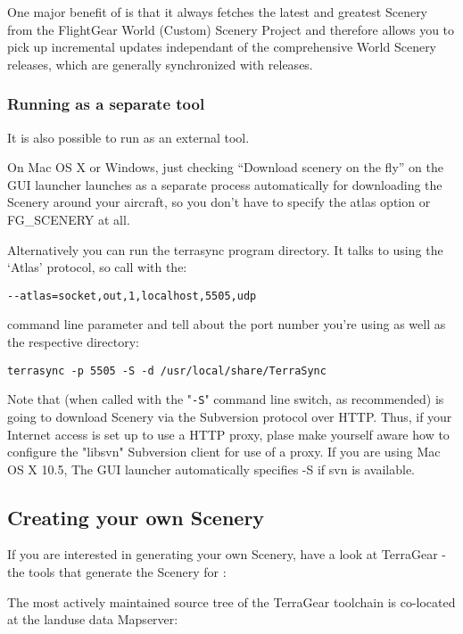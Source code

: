 One major benefit of \TerraSync{} is that it always fetches the latest and
greatest Scenery from the FlightGear World (Custom) Scenery Project and
therefore allows you to pick up incremental updates independant of the
comprehensive World Scenery releases, which are generally synchronized
with \FlightGear{} releases.

\subsubsection{Running \TerraSync{} as a separate tool}

It is also possible to run \TerraSync{} as an external tool. 

On Mac OS X or Windows, just checking ``Download scenery on the fly'' on
the GUI launcher launches \TerraSync{} as a separate process automatically 
for downloading the Scenery around your aircraft, so you don't have to 
specify the atlas option or FG\_SCENERY at all. 

Alternatively you can run the terrasync program directory. It talks to
\FlightGear{} using the `Atlas' protocol, so call \FlightGear{} with the:

\texttt{-$ $-atlas=socket,out,1,localhost,5505,udp}

command line parameter and tell \TerraSync{} about the port number you're
using as well as the respective directory:

\texttt{terrasync -p 5505 -S -d /usr/local/share/TerraSync}
\medskip

Note that \TerraSync{} (when called with the "\texttt{-S}" command line
switch, as recommended) is going to download Scenery via the Subversion
protocol over HTTP. Thus, if your Internet access is set up to use a
HTTP proxy, plase make yourself aware how to configure the "libsvn"
Subversion client for use of a proxy. If you are using Mac OS X 10.5,
The GUI launcher automatically specifies -S if svn is available.
\medskip

\subsection{Creating your own Scenery}

If you are interested in generating your own Scenery, have a look at TerraGear -
the tools that generate the Scenery for \FlightGear{}:

\medskip
{}
\medskip

The most actively maintained source tree of the TerraGear toolchain is
co-located at the \FlightGear{} landuse data Mapserver:

